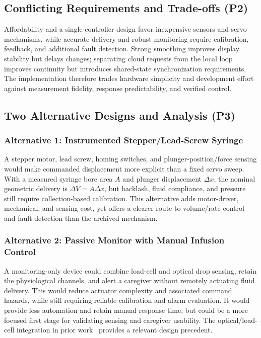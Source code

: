 \subsection{Conflicting Requirements and Trade-offs (P2)}
Affordability and a single-controller design favor inexpensive sensors and servo mechanisms, while accurate delivery and robust monitoring require calibration, feedback, and additional fault detection. Strong smoothing improves display stability but delays changes; separating cloud requests from the local loop improves continuity but introduces shared-state synchronization requirements. The implementation therefore trades hardware simplicity and development effort against measurement fidelity, response predictability, and verified control.

\subsection{Two Alternative Designs and Analysis (P3)}
\subsubsection{Alternative 1: Instrumented Stepper/Lead-Screw Syringe}
A stepper motor, lead screw, homing switches, and plunger-position/force sensing would make commanded displacement more explicit than a fixed servo sweep. With a measured syringe bore area $A$ and plunger displacement $\Delta x$, the nominal geometric delivery is $\Delta V=A\Delta x$, but backlash, fluid compliance, and pressure still require collection-based calibration. This alternative adds motor-driver, mechanical, and sensing cost, yet offers a clearer route to volume/rate control and fault detection than the archived mechanism.

\subsubsection{Alternative 2: Passive Monitor with Manual Infusion Control}
A monitoring-only device could combine load-cell and optical drop sensing, retain the physiological channels, and alert a caregiver without remotely actuating fluid delivery. This would reduce actuator complexity and associated command hazards, while still requiring reliable calibration and alarm evaluation. It would provide less automation and retain manual response time, but could be a more focused first stage for validating sensing and caregiver usability. The optical/load-cell integration in prior work~\cite{lee2021} provides a relevant design precedent.

